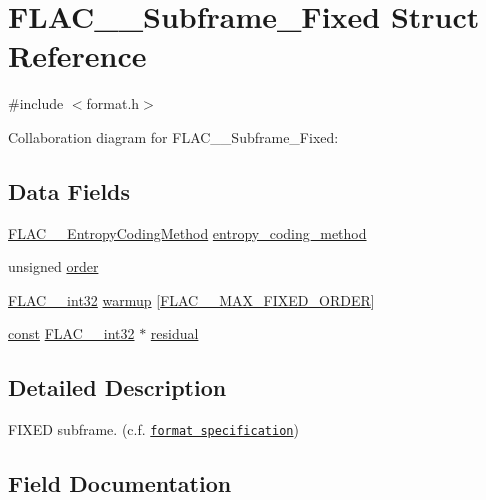 \hypertarget{struct_f_l_a_c_____subframe___fixed}{}\section{F\+L\+A\+C\+\_\+\+\_\+\+Subframe\+\_\+\+Fixed Struct Reference}
\label{struct_f_l_a_c_____subframe___fixed}


{\ttfamily \#include $<$format.\+h$>$}



Collaboration diagram for F\+L\+A\+C\+\_\+\+\_\+\+Subframe\+\_\+\+Fixed\+:
\subsection*{Data Fields}
\begin{DoxyCompactItemize}
\item 
\hyperlink{struct_f_l_a_c_____entropy_coding_method}{F\+L\+A\+C\+\_\+\+\_\+\+Entropy\+Coding\+Method} \hyperlink{struct_f_l_a_c_____subframe___fixed_a0f17f8f756cd2c8acc0262ef14c37088}{entropy\+\_\+coding\+\_\+method}
\item 
unsigned \hyperlink{struct_f_l_a_c_____subframe___fixed_a73f6f3cce3f811c81532729dbad2df0d}{order}
\item 
\hyperlink{ordinals_8h_a33fd77bfe6d685541a0c034a75deccdc}{F\+L\+A\+C\+\_\+\+\_\+int32} \hyperlink{struct_f_l_a_c_____subframe___fixed_a0e9a40fb89b8aa45f83bf8979d200f1f}{warmup} \mbox{[}\hyperlink{group__flac__format_gabd0d5d6fe71b337244712b244ae7cb0f}{F\+L\+A\+C\+\_\+\+\_\+\+M\+A\+X\+\_\+\+F\+I\+X\+E\+D\+\_\+\+O\+R\+D\+ER}\mbox{]}
\item 
\hyperlink{zconf_8h_a2c212835823e3c54a8ab6d95c652660e}{const} \hyperlink{ordinals_8h_a33fd77bfe6d685541a0c034a75deccdc}{F\+L\+A\+C\+\_\+\+\_\+int32} $\ast$ \hyperlink{struct_f_l_a_c_____subframe___fixed_ab91be48874aec97177106a4086163188}{residual}
\end{DoxyCompactItemize}


\subsection{Detailed Description}
F\+I\+X\+ED subframe. (c.\+f. \href{../format.html#subframe_fixed}{\tt format specification}) 

\subsection{Field Documentation}
\mbox{\label{struct_f_l_a_c_____subframe___fixed_a0f17f8f756cd2c8acc0262ef14c37088}} 
